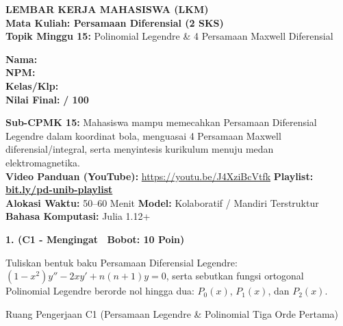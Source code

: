 \documentclass[10pt,a4paper]{article}
\begin{document}
\noindent\begin{minipage}[c]{0.68\textwidth}%
  {\large\textbf{\color{unibblue}LEMBAR KERJA MAHASISWA (LKM)}}\\[1mm]
  {\normalsize\textbf{Mata Kuliah: Persamaan Diferensial (2 SKS)}}\\[0.5mm]
  {\small\textbf{Topik Minggu 15:} Polinomial Legendre \& 4 Persamaan Maxwell Diferensial}%
\end{minipage}%
\hfill%
\begin{minipage}[c]{0.30\textwidth}%
  \begin{tcolorbox}[colback=unibblue!5,colframe=unibblue,boxrule=0.6pt,arc=2pt,left=4pt,right=4pt,top=2pt,bottom=2pt]
    \scriptsize
    \textbf{Nama:} \dotfill\\[1.2mm]
    \textbf{NPM:} \dotfill\\[1.2mm]
    \textbf{Kelas/Klp:} \dotfill\\[1.2mm]
    \textbf{Nilai Final:} \hfill \textbf{/ 100}
  \end{tcolorbox}%
\end{minipage}\par

\vspace{1.5mm}

\begin{tcolorbox}[colback=boxbg,colframe=unibgold!90!black,boxrule=0.6pt,arc=2pt,left=5pt,right=5pt,top=3pt,bottom=3pt,title=\textbf{\scriptsize Capaian Pembelajaran (Sub-CPMK 15) \& Pedoman Evaluasi OBE}]
  \scriptsize
  \textbf{Sub-CPMK 15:} Mahasiswa mampu memecahkan Persamaan Diferensial Legendre dalam koordinat bola, menguasai 4 Persamaan Maxwell diferensial/integral, serta menyintesis kurikulum menuju medan elektromagnetika.\\
  \textbf{Video Panduan (YouTube):} \url{https://youtu.be/J4XziBcVtfk} \hfill \textbf{Playlist:} \href{https://www.youtube.com/playlist?list=PLS5oOZWXZeTw}{\color{unibblue}\textbf{bit.ly/pd-unib-playlist}}\\\textbf{Alokasi Waktu:} 50--60 Menit \quad\textbar\quad \textbf{Model:} Kolaboratif / Mandiri Terstruktur \quad\textbar\quad \textbf{Bahasa Komputasi:} Julia 1.12+
\end{tcolorbox}

\vspace{1mm}

\noindent\textbf{1. (C1 - Mengingat \textbar\ Bobot: 10 Poin)}\par\vspace{0.5mm}
{\footnotesize Tuliskan bentuk baku Persamaan Diferensial Legendre: $(1-x^2)y'' - 2x y' + n(n+1)y = 0$, serta sebutkan fungsi ortogonal Polinomial Legendre berorde nol hingga dua: $P_0(x)$, $P_1(x)$, dan $P_2(x)$.}
\begin{answerbox}{Ruang Pengerjaan C1 (Persamaan Legendre \& Polinomial Tiga Orde Pertama)}
  \vspace{2.0cm}
\end{answerbox}
\end{document}
